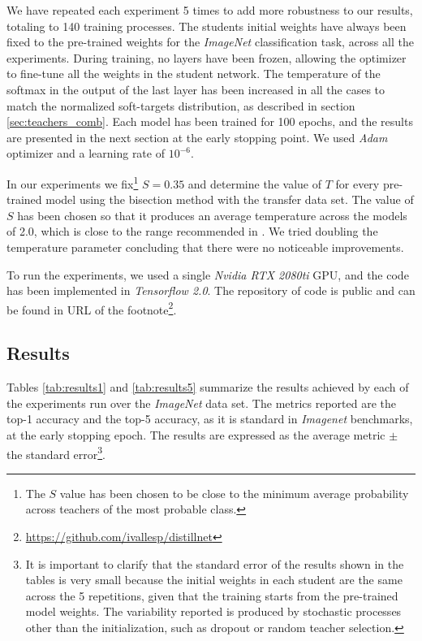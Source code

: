 We have repeated each experiment 5 times to add more robustness to our results, totaling to 140 training processes. The students initial weights have always been fixed to the pre-trained weights for the \textit{ImageNet} classification task, across all the experiments. During training, no layers have been frozen, allowing the optimizer to fine-tune all the weights in the student network. The temperature of the softmax in the output of the last layer has been increased in all the cases to match the normalized soft-targets distribution, as described in section \ref{sec:teachers_comb}.  Each model has been trained for 100 epochs, and the results are presented in the next section at the early stopping point. We used \textit{Adam} optimizer \cite{Kingma14} and a learning rate of $10^{-6}$.

In our experiments we fix\footnote{The $S$ value has been chosen to be close to the minimum average probability across teachers of the most probable class.} $S=0.35$ and determine the value of $T$ for every pre-trained model using the bisection method with the transfer data set. The value of $S$ has been chosen so that it produces an average temperature across the models of 2.0, which is close to the range recommended in \cite{hinton2015}. We tried doubling the temperature parameter concluding that there were no noticeable improvements.

To run the experiments, we used a single \textit{Nvidia RTX 2080ti} GPU, and the code has been implemented in \textit{Tensorflow 2.0}. The repository of code is public and can be found in URL of the footnote\footnote{\url{https://github.com/ivallesp/distillnet}}.

\subsection{Results}  \label{sec:results}
Tables \ref{tab:results1} and \ref{tab:results5} summarize the results achieved by each of the experiments run over the \textit{ImageNet} data set. The metrics reported are the top-1 accuracy and the top-5 accuracy, as it is standard in \textit{Imagenet} benchmarks, at the early stopping epoch. The results are expressed as the average metric $\pm$ the standard error\footnote{It is important to clarify that the standard error of the results shown in the tables is very small because the initial weights in each student are the same across the 5 repetitions, given that the training starts from the pre-trained model weights. The variability reported is produced by stochastic processes other than the initialization, such as dropout or random teacher selection.}.

